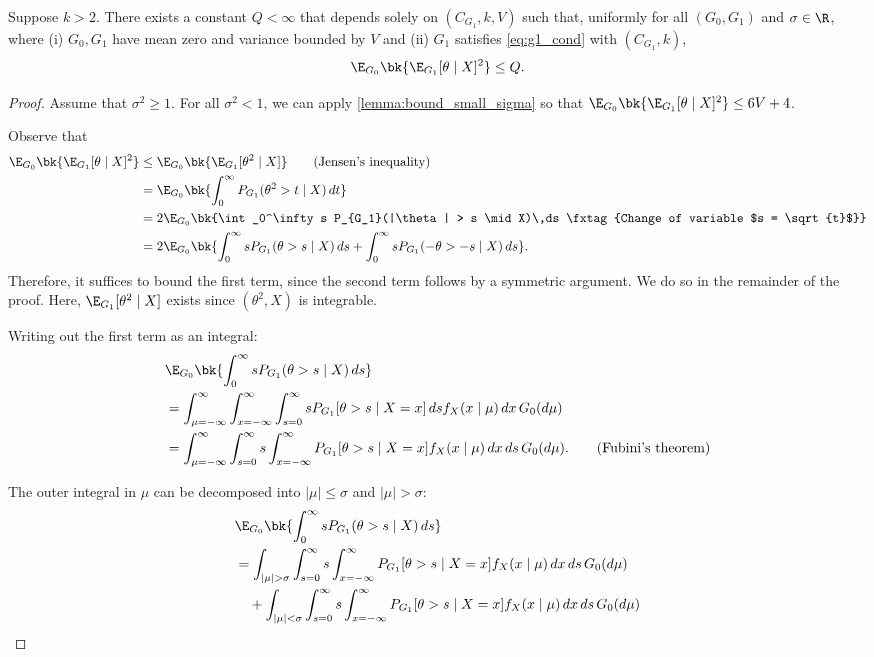 \documentclass[12pt, reqno]{amsart}
\numberwithin{equation}{section}
\begin{document}
\begin{refsection}
\begin{appendices}
\begin{theorem}
\label{thm:max_risk}
Suppose $k > 2.$ There exists a constant $Q < \infty$ that depends solely on $(C_ {G_1},
k, V)$ such that, uniformly for all $(G_0, G_1)$ and $\sigma \in \R$, where (i) $G_0,G_1$
have mean zero and variance bounded by $V$ and (ii) $G_1$ satisfies
\eqref{eq:g1_cond} with $(C_{G_1},
k)$, \[
\E_{G_0}\bk{\E_{G_1}[\theta\mid X]^2} \le Q.
\]
\end{theorem}

\begin{proof}
Assume that $ \sigma^2 \ge 1 $. For all $\sigma^2 < 1$, we can apply 
\cref{lemma:bound_small_sigma}
so that $\E_{G_0}\bk{\E_{G_1}[\theta\mid X]^2} \le 6V + 4$. 

Observe that \begin{align*}
\E_{G_0}\bk{\E_{G_1} [\theta \mid X]^2} &\le \E_{G_0} \bk{\E_{G_1}[\theta^2 \mid X]}  \tag{Jensen's
inequality} \\
&= \E_{G_0}\bk{\int_{0}^\infty P_{G_1}(\theta^2 > t \mid X) \,dt} \\
&= 2\E_{G_0}\bk{\int_0^\infty s P_{G_1}(|\theta| > s \mid X)\,ds \tag{Change of variable $s
=
\sqrt{t}$}}
\\
&= 2\E_{G_0}\bk{\int_0^\infty s P_{G_1}(\theta > s \mid X)\,ds + \int_0^\infty s P_{G_1}
(-\theta > -s
\mid X)\,ds}.
\end{align*}
Therefore, it suffices to bound the first term, since the second term follows by a
symmetric argument. We do so in the remainder of the proof. Here, $\E_{G_1}[\theta^2
\mid X]$ exists since $(\theta^2, X)$ is integrable. 

Writing out the first term as an integral:
\begin{align*} &\E_{G_0}
\bk{\int_0^\infty s P_ {G_1} (\theta > s \mid
X)\,ds} \\ &= \int_ {\mu=-\infty}^\infty\int_{x=-\infty}^\infty \int_{s=0}^\infty  s
P_{G_1}[\theta > s
\mid
X=x]\, ds f_X (x\mid \mu)
\,dx\,G_0(d\mu)\\
&= \int_
{\mu=-\infty}^\infty  \int_{s=0}^\infty s \int_{x=-\infty}^\infty P_{G_1}[\theta > s
\mid
X=x]  f_X (x\mid \mu) \,dx \,ds \,G_0(d\mu). \tag{Fubini's theorem}
\end{align*}

The outer integral in $\mu$ can be decomposed into $|\mu| \le \sigma$ and $|\mu| >
\sigma$: \begin{align}
&\E_{G_0}\bk{\int_0^\infty s P_ {G_1} (\theta > s \mid
X)\,ds} \nonumber\\
&= \int_
{|\mu| > \sigma}  \int_{s=0}^\infty s \int_{x=-\infty}^\infty P_{G_1}[\theta > s
\mid
X=x]  f_X (x\mid \mu) \,dx \,ds \,G_0(d\mu)\label{eq:small_sigma}
\\
&\quad+ \int_
{|\mu| < \sigma} \int_{s=0}^\infty s \int_{x=-\infty}^\infty P_{G_1}[\theta > s
\mid
X=x]  f_X (x\mid \mu) \,dx \,ds \,G_0(d\mu) \label{eq:large_sigma}
\end{align}


\end{proof}
\end{appendices}
\end{refsection}
\end{document}
